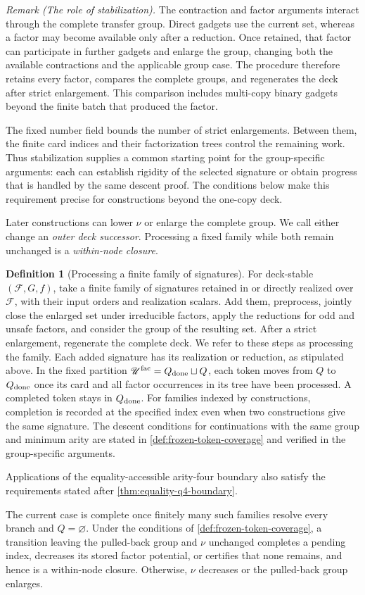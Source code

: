 \documentclass[11pt,letterpaper,onecolumn]{article}
\theoremstyle{plain}
\theoremstyle{definition}
\newtheorem{definition}[definition]{Definition}
\theoremstyle{remark}
\newcommand{\cF}{\mathcal F}
\begin{document}
\smallskip
\noindent\textit{Remark (The role of stabilization).}
The contraction and factor arguments interact through the complete
transfer group. Direct gadgets use the current set, whereas a factor
may become available only after a reduction. Once retained, that factor
can participate in further gadgets and enlarge the group, changing both
the available contractions and the applicable group case. The procedure
therefore retains every factor, compares the complete groups, and
regenerates the deck after strict enlargement. This comparison includes
multi-copy binary gadgets beyond the finite batch that produced the factor.

The fixed number field bounds the number of strict enlargements. Between
them, the finite card indices and their factorization trees control the
remaining work. Thus stabilization supplies a common starting point for
the group-specific arguments: each can establish rigidity of the selected
signature or obtain progress that is handled by the same descent proof.
The conditions below make this requirement precise for constructions
beyond the one-copy deck.

Later constructions can lower \(\nu\) or enlarge the complete group.
We call either change an \emph{outer deck successor}. Processing a fixed
family while both remain unchanged is a \emph{within-node closure}.

\begin{definition}[Processing a finite family of signatures]
\label{def:relative-stratum-protocol}
For deck-stable \((\cF,G,f)\), take a finite family of signatures
retained in or directly realized over \(\cF\), with their input orders
and realization scalars.  Add them, preprocess, jointly close the enlarged set under irreducible factors,
apply the reductions for odd and unsafe factors, and consider the group of the resulting set.
After a strict enlargement, regenerate the complete deck. We refer to
these steps as processing the family. Each added signature has its
realization or reduction, as stipulated above. In the fixed partition
\(\mathscr U^{\mathrm{fac}}=Q_{\rm done}\sqcup Q\), each token moves from
\(Q\) to \(Q_{\rm done}\) once its card and all factor occurrences in its
tree have been processed. A completed token stays in \(Q_{\rm done}\).
For families indexed by constructions, completion is recorded at the
specified index even when two constructions give the same signature.
The descent conditions for continuations with the same group and
minimum arity are stated in \cref{def:frozen-token-coverage} and verified
in the group-specific arguments.

Applications of the equality-accessible arity-four boundary also satisfy
the requirements stated after \cref{thm:equality-q4-boundary}.

The current case is complete once finitely many such families resolve every
branch and \(Q=\varnothing\).  Under the conditions of \cref{def:frozen-token-coverage}, a transition leaving the pulled-back
group and \(\nu\) unchanged completes a pending index, decreases its stored
factor potential, or certifies that none remains, and hence is a within-node
closure. Otherwise, \(\nu\) decreases or the pulled-back group enlarges.
\end{definition}
\end{document}
